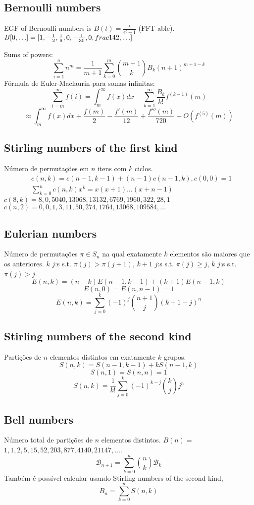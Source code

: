 	\subsection{Bernoulli numbers}
		EGF of Bernoulli numbers is $B(t)=\frac{t}{e^t-1}$ (FFT-able).
		$B[0,\ldots] = [1, -\frac{1}{2}, \frac{1}{6}, 0, -\frac{1}{30}, 0, \\frac{1}{42}, \ldots]$

		Sums of powers:
		\small
		\[ \sum_{i=1}^n n^m = \frac{1}{m+1} \sum_{k=0}^m \binom{m+1}{k} B_k (n+1)^{m+1-k} \]
		\normalsize
		Fórmula de Euler-Maclaurin para somas infinitas:
		\small
		\[ \sum_{i=m}^{\infty} f(i) = \int_m^\infty f(x) dx - \sum_{k=1}^\infty \frac{B_k}{k!}f^{(k-1)}(m) \]
		\[ \approx \int_{m}^\infty f(x)dx + \frac{f(m)}{2} - \frac{f'(m)}{12} + \frac{f'''(m)}{720} + O(f^{(5)}(m)) \]
		\normalsize

	\subsection{Stirling numbers of the first kind}
		Número de permutações em $n$ itens com $k$ ciclos.
		\begin{align*}
			&c(n,k) = c(n-1,k-1) + (n-1) c(n-1,k), c(0,0) = 1\\
			&\textstyle \sum_{k=0}^n c(n,k)x^k = x(x+1) \dots (x+n-1)
		\end{align*}
		$c(8,k) = 8, 0, 5040, 13068, 13132, 6769, 1960, 322, 28, 1$ 
		$c(n,2) = 0, 0, 1, 3, 11, 50, 274, 1764, 13068, 109584, \dots$

	\subsection{Eulerian numbers}
		Número de permutações $\pi \in S_n$ na qual exatamente $k$ elementos são maiores que os anteriores. $k$ $j$:s s.t. $\pi(j)>\pi(j+1)$, $k+1$ $j$:s s.t. $\pi(j)\geq j$, $k$ $j$:s s.t. $\pi(j)>j$.
		$$E(n,k) = (n-k)E(n-1,k-1) + (k+1)E(n-1,k)$$
		$$E(n,0) = E(n,n-1) = 1$$
		$$E(n,k) = \sum_{j=0}^k(-1)^j\binom{n+1}{j}(k+1-j)^n$$

	\subsection{Stirling numbers of the second kind}
		Partições de $n$ elementos distintos em exatamente $k$ grupos.
		$$S(n,k) = S(n-1,k-1) + k S(n-1,k)$$
		$$S(n,1) = S(n,n) = 1$$
		$$S(n,k) = \frac{1}{k!}\sum_{j=0}^k (-1)^{k-j}\binom{k}{j}j^n$$

	\subsection{Bell numbers}
		Número total de partições de $n$ elementos distintos. $B(n) =$
		$1, 1, 2, 5, 15, 52, 203, 877, 4140, 21147, \dots$. 
		\begin{equation*}
        \mathcal{B}_{n+1} = \sum_{k=0}^n \binom{n}{k} \mathcal{B}_k
      \end{equation*}
      Também é possível calcular usando Stirling numbers of the second kind,
      \[B_n = \sum_{k = 0}^{n} S(n, k)\]

